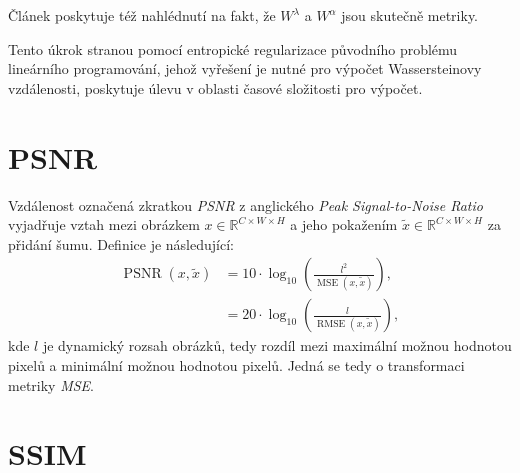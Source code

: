 \documentclass[czech]{article}
\begin{document}

Článek \cite{wass_computation} poskytuje též nahlédnutí na fakt, že $W^\lambda$ a $W^\alpha$ jsou skutečně metriky.

Tento úkrok stranou pomocí entropické regularizace původního problému lineárního programování,
jehož vyřešení je nutné pro výpočet Wassersteinovy vzdálenosti, poskytuje úlevu v oblasti časové složitosti pro výpočet.



\section{PSNR}

Vzdálenost označená zkratkou \emph{PSNR} z anglického \emph{Peak Signal-to-Noise Ratio}
vyjadřuje vztah mezi obrázkem $x \in \mathbb{R}^{C \times W \times H}$
a jeho pokažením $\tilde{x} \in \mathbb{R}^{C \times W \times H}$ za přidání šumu.
Definice je následující:
\begin{align}
    \operatorname{PSNR}(x, \tilde{x}) &= 10 \cdot \operatorname{log}_{10} \left( \frac{l^2}{\operatorname{MSE}(x, \tilde{x})} \right), \\
    &= 20 \cdot \operatorname{log}_{10} \left( \frac{l}{\operatorname{RMSE}(x, \tilde{x})} \right),
\end{align}
kde $l$ je dynamický rozsah obrázků, tedy rozdíl mezi maximální možnou hodnotou pixelů a minimální možnou hodnotou pixelů.
Jedná se tedy o transformaci metriky \emph{MSE}.

\section{SSIM}
\end{document}
